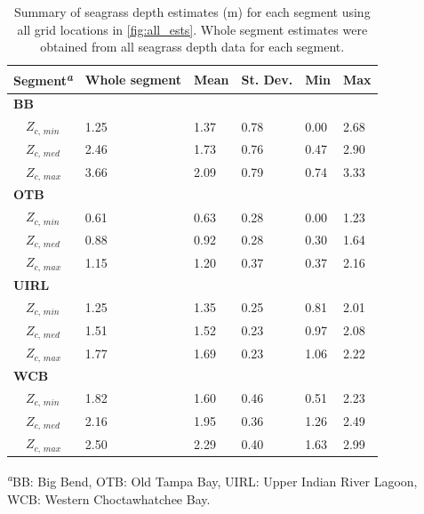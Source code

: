 \documentclass[letterpaper,12pt,oneside]{article}\usepackage[]{graphicx}\usepackage[]{color}
\begin{document}
\begin{table}[!tbp]
\caption{Summary of seagrass depth estimates (m) for each segment using all grid locations in \cref{fig:all_ests}.  Whole segment estimates were obtained from all seagrass depth data for each segment.\label{tab:est_summ}} 
\begin{center}
\begin{tabular}{llllll}
\hline\hline
\multicolumn{1}{l}{{\bf Segment\textsuperscript{\textit{a}}}}&\multicolumn{1}{c}{Whole segment}&\multicolumn{1}{c}{Mean}&\multicolumn{1}{c}{St. Dev.}&\multicolumn{1}{c}{Min}&\multicolumn{1}{c}{Max}\tabularnewline
\hline
{\bfseries BB}&&&&&\tabularnewline
~~$Z_{c,\,min}$&1.25&1.37&0.78&0.00&2.68\tabularnewline
~~$Z_{c,\,med}$&2.46&1.73&0.76&0.47&2.90\tabularnewline
~~$Z_{c,\,max}$&3.66&2.09&0.79&0.74&3.33\tabularnewline
\hline
{\bfseries OTB}&&&&&\tabularnewline
~~$Z_{c,\,min}$&0.61&0.63&0.28&0.00&1.23\tabularnewline
~~$Z_{c,\,med}$&0.88&0.92&0.28&0.30&1.64\tabularnewline
~~$Z_{c,\,max}$&1.15&1.20&0.37&0.37&2.16\tabularnewline
\hline
{\bfseries UIRL}&&&&&\tabularnewline
~~$Z_{c,\,min}$&1.25&1.35&0.25&0.81&2.01\tabularnewline
~~$Z_{c,\,med}$&1.51&1.52&0.23&0.97&2.08\tabularnewline
~~$Z_{c,\,max}$&1.77&1.69&0.23&1.06&2.22\tabularnewline
\hline
{\bfseries WCB}&&&&&\tabularnewline
~~$Z_{c,\,min}$&1.82&1.60&0.46&0.51&2.23\tabularnewline
~~$Z_{c,\,med}$&2.16&1.95&0.36&1.26&2.49\tabularnewline
~~$Z_{c,\,max}$&2.50&2.29&0.40&1.63&2.99\tabularnewline
\hline
\end{tabular}\end{center}

\textsuperscript{\textit{a}}\footnotesize BB: Big Bend, OTB: Old Tampa Bay, UIRL: Upper Indian River Lagoon, WCB: Western Choctawhatchee Bay.\end{table}
\end{document}
